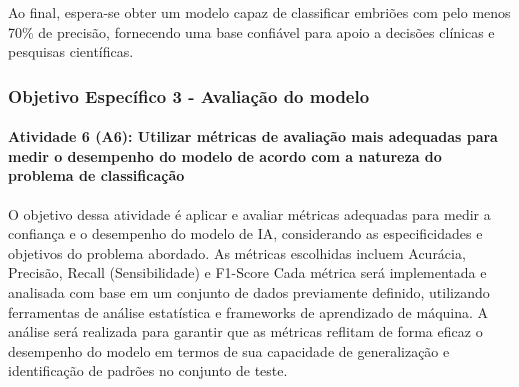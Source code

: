 Ao final, espera-se obter um modelo capaz de classificar embriões com pelo menos 70\% de precisão, fornecendo uma base confiável para apoio a decisões clínicas e pesquisas científicas.

\subsubsection{\textbf{Objetivo Específico 3} - Avaliação do modelo}

\paragraph{\textbf{Atividade 6 (A6):} Utilizar métricas de avaliação mais adequadas para medir o desempenho do modelo de acordo com a natureza do problema de classificação}

O objetivo dessa atividade é aplicar e avaliar métricas adequadas para medir a confiança e o desempenho do modelo de IA, considerando as especificidades e objetivos do problema abordado. As métricas escolhidas incluem Acurácia, Precisão, Recall (Sensibilidade) e F1-Score Cada métrica será implementada e analisada com base em um conjunto de dados previamente definido, utilizando ferramentas de análise estatística e frameworks de aprendizado de máquina. A análise será realizada para garantir que as métricas reflitam de forma eficaz o desempenho do modelo em termos de sua capacidade de generalização e identificação de padrões no conjunto de teste.


